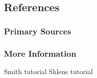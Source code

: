 \subsection{References}

\subsubsection{Primary Sources}



\subsubsection{More Information}

Smith tutorial \cite{Smith2002}
Shlens tutorial \cite{Shlens2005}




